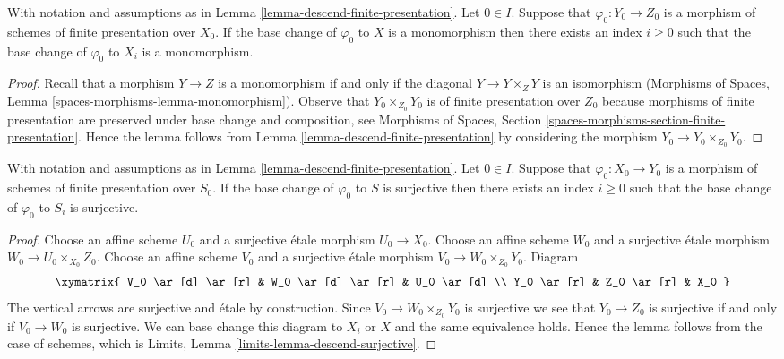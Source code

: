 \begin{lemma}
\label{lemma-descend-monomorphism}
With notation and assumptions as in
Lemma \ref{lemma-descend-finite-presentation}.
Let $0 \in I$. Suppose that $\varphi_0 : Y_0 \to Z_0$
is a morphism of schemes of finite presentation over $X_0$.
If the base change of $\varphi_0$ to $X$ is a monomorphism
then there exists an index $i \geq 0$ such that
the base change of $\varphi_0$ to $X_i$ is a monomorphism.
\end{lemma}

\begin{proof}
Recall that a morphism $Y \to Z$ is a monomorphism if and
only if the diagonal $Y \to Y \times_Z Y$ is an isomorphism
(Morphisms of Spaces, Lemma \ref{spaces-morphisms-lemma-monomorphism}).
Observe that $Y_0 \times_{Z_0} Y_0$ is of finite presentation over $Z_0$
because morphisms of finite presentation are preserved under base change and
composition, see Morphisms of Spaces, Section
\ref{spaces-morphisms-section-finite-presentation}.
Hence the lemma follows from Lemma \ref{lemma-descend-finite-presentation}
by considering the morphism $Y_0 \to Y_0 \times_{Z_0} Y_0$.
\end{proof}

\begin{lemma}
\label{lemma-descend-surjective}
With notation and assumptions as in
Lemma \ref{lemma-descend-finite-presentation}.
Let $0 \in I$. Suppose that $\varphi_0 : X_0 \to Y_0$
is a morphism of schemes of finite presentation over $S_0$.
If the base change of $\varphi_0$ to $S$ is surjective
then there exists an index $i \geq 0$ such that
the base change of $\varphi_0$ to $S_i$ is surjective.
\end{lemma}

\begin{proof}
Choose an affine scheme $U_0$ and a surjective \'etale morphism
$U_0 \to X_0$. Choose an affine scheme $W_0$ and a surjective \'etale
morphism $W_0 \to U_0 \times_{X_0} Z_0$. Choose an affine scheme
$V_0$ and a surjective \'etale morphism $V_0 \to W_0 \times_{Z_0} Y_0$.
Diagram
$$
\xymatrix{
V_0 \ar[d] \ar[r] & W_0 \ar[d] \ar[r] & U_0 \ar[d] \\
Y_0 \ar[r] & Z_0 \ar[r] & X_0
}
$$
The vertical arrows are surjective and \'etale by construction.
Since $V_0 \to  W_0 \times_{Z_0} Y_0$ is surjective we see that
$Y_0 \to Z_0$ is surjective if and only if $V_0 \to W_0$ is
surjective. We can base change this diagram to $X_i$ or $X$ and
the same equivalence holds. Hence the lemma follows from the case of
schemes, which is
Limits, Lemma \ref{limits-lemma-descend-surjective}.
\end{proof}

